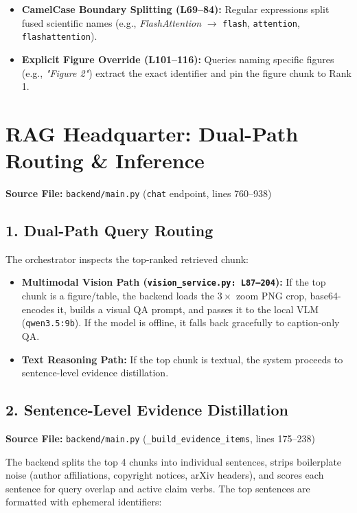 \documentclass[10pt,a4paper]{article}
\begin{document}
\begin{itemize}[leftmargin=1.5em, itemsep=2pt]
    \item \textbf{CamelCase Boundary Splitting (L69--84):} Regular expressions split fused scientific names (e.g., \textit{FlashAttention} $\rightarrow$ \texttt{flash}, \texttt{attention}, \texttt{flashattention}).
    \item \textbf{Explicit Figure Override (L101--116):} Queries naming specific figures (e.g., \textit{"Figure 2"}) extract the exact identifier and pin the figure chunk to Rank 1.
\end{itemize}

\newpage

\section{RAG Headquarter: Dual-Path Routing \& Inference}

\textbf{Source File:} \texttt{backend/main.py} (\texttt{chat} endpoint, lines 760--938)

\subsection{1. Dual-Path Query Routing}
The orchestrator inspects the top-ranked retrieved chunk:
\begin{itemize}[leftmargin=1.5em, itemsep=2pt]
    \item \textbf{Multimodal Vision Path (\texttt{vision\_service.py: L87--204}):} If the top chunk is a figure/table, the backend loads the $3\times$ zoom PNG crop, base64-encodes it, builds a visual QA prompt, and passes it to the local VLM (\texttt{qwen3.5:9b}). If the model is offline, it falls back gracefully to caption-only QA.
    \item \textbf{Text Reasoning Path:} If the top chunk is textual, the system proceeds to sentence-level evidence distillation.
\end{itemize}

\subsection{2. Sentence-Level Evidence Distillation}
\textbf{Source File:} \texttt{backend/main.py} (\texttt{\_build\_evidence\_items}, lines 175--238)

The backend splits the top 4 chunks into individual sentences, strips boilerplate noise (author affiliations, copyright notices, arXiv headers), and scores each sentence for query overlap and active claim verbs. The top sentences are formatted with ephemeral identifiers:
\end{document}
